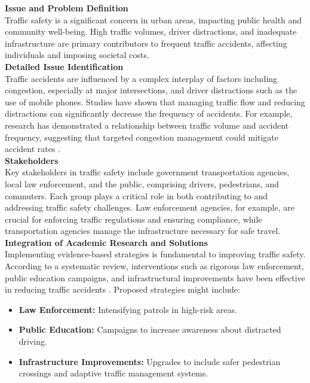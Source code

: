 \documentclass[12pt,a4paper]{article}
\begin{document}
\noindent\textbf{Issue and Problem Definition}\\
\noindent Traffic safety is a significant concern in urban areas, impacting public health and community well-being. High traffic volumes, driver distractions, and inadequate infrastructure are primary contributors to frequent traffic accidents, affecting individuals and imposing societal costs.\\

\noindent\textbf{Detailed Issue Identification}\\
\noindent Traffic accidents are influenced by a complex interplay of factors including congestion, especially at major intersections, and driver distractions such as the use of mobile phones. Studies have shown that managing traffic flow and reducing distractions can significantly decrease the frequency of accidents. For example, research has demonstrated a relationship between traffic volume and accident frequency, suggesting that targeted congestion management could mitigate accident rates \citep{question_1.1}.\\

\noindent\textbf{Stakeholders}\\
\noindent Key stakeholders in traffic safety include government transportation agencies, local law enforcement, and the public, comprising drivers, pedestrians, and commuters. Each group plays a critical role in both contributing to and addressing traffic safety challenges. Law enforcement agencies, for example, are crucial for enforcing traffic regulations and ensuring compliance, while transportation agencies manage the infrastructure necessary for safe travel.\\

\noindent\textbf{Integration of Academic Research and Solutions}\\
\noindent Implementing evidence-based strategies is fundamental to improving traffic safety. According to a systematic review, interventions such as rigorous law enforcement, public education campaigns, and infrastructural improvements have been effective in reducing traffic accidents \citep{question_1.2}. Proposed strategies might include:

\begin{itemize}
    \item \textbf{Law Enforcement:} Intensifying patrols in high-risk areas.
    \item \textbf{Public Education:} Campaigns to increase awareness about distracted driving.
    \item \textbf{Infrastructure Improvements:} Upgrades to include safer pedestrian crossings and adaptive traffic management systems.
\end{itemize}
\end{document}
